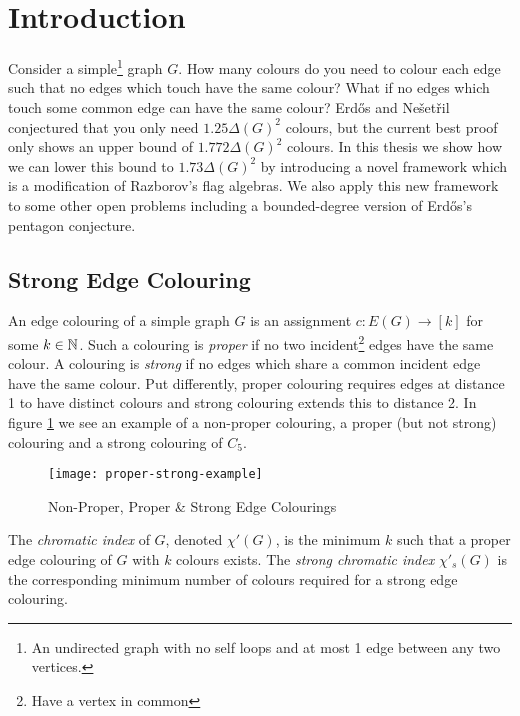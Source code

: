 \chapter*{Introduction}

Consider a simple\footnote{An undirected graph with no self loops and at most 1 edge between any two
vertices.} graph $G$. How many colours do you need to colour each edge such that no edges which touch
have the same colour? What if no edges which touch some common edge can have the same colour?
Erd\H{o}s and Nešetřil conjectured that you only need $1.25\Delta(G)^2$ colours, but
the current best proof only shows an upper bound of $1.772\Delta(G)^2$ colours. In this thesis
we show how we can lower this bound to $1.73\Delta(G)^2$ by introducing a novel framework
which is a modification of Razborov's flag algebras. We also apply this new framework
to some other open problems including a bounded-degree version of
Erd\H{o}s's pentagon conjecture.

\section*{Strong Edge Colouring}
\label{sec:intro_strong_edge_coloring}

An edge colouring of a simple graph $G$ is an assignment $c\colon E(G) \to [k]$
for some $k\in\mathbb{N}$. Such a colouring is \textit{proper} if no two incident\footnote{Have a vertex in common}
edges have the same colour.
A colouring is \textit{strong} if no edges which share a common incident edge have
the same colour. Put differently, proper colouring requires edges at distance 1 to have distinct
colours and strong colouring extends this to distance 2.
In figure \ref{fig:proper-strong-example} we see an example of a non-proper colouring,
a proper (but not strong) colouring and a strong colouring of $C_5$.

\begin{figure}[h]
    \centering
    \texttt{[image: proper-strong-example]}
    \caption{Non-Proper, Proper \& Strong Edge Colourings}
    \label{fig:proper-strong-example}
\end{figure}

The \textit{chromatic index} of $G$, denoted $\chi'(G)$, is the minimum $k$ such that a proper edge
colouring of $G$ with $k$ colours exists. The \textit{strong chromatic index} $\chi'_s(G)$
is the corresponding minimum number of colours required for a strong edge colouring.

